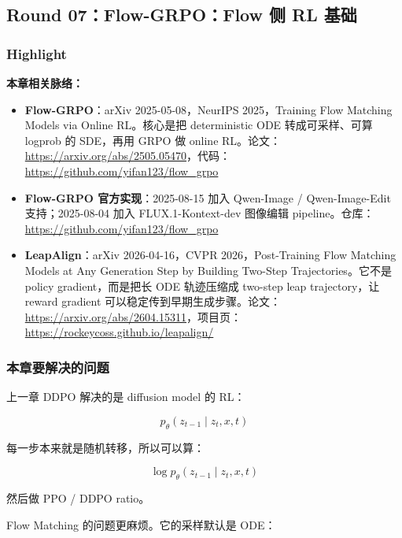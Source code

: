 
\subsection{Round 07：Flow-GRPO：Flow 侧 RL 基础}

\subsubsection{Highlight}

\begin{conceptbox}
\textbf{本章相关脉络：}
\begin{itemize}[leftmargin=1.5em]
  \item \textbf{Flow-GRPO}：arXiv 2025-05-08，NeurIPS 2025，Training Flow Matching Models via Online RL。核心是把 deterministic ODE 转成可采样、可算 logprob 的 SDE，再用 GRPO 做 online RL。论文：\url{https://arxiv.org/abs/2505.05470}，代码：\url{https://github.com/yifan123/flow_grpo}
  \item \textbf{Flow-GRPO 官方实现}：2025-08-15 加入 Qwen-Image / Qwen-Image-Edit 支持；2025-08-04 加入 FLUX.1-Kontext-dev 图像编辑 pipeline。仓库：\url{https://github.com/yifan123/flow_grpo}
  \item \textbf{LeapAlign}：arXiv 2026-04-16，CVPR 2026，Post-Training Flow Matching Models at Any Generation Step by Building Two-Step Trajectories。它不是 policy gradient，而是把长 ODE 轨迹压缩成 two-step leap trajectory，让 reward gradient 可以稳定传到早期生成步骤。论文：\url{https://arxiv.org/abs/2604.15311}，项目页：\url{https://rockeycoss.github.io/leapalign/}
\end{itemize}
\end{conceptbox}

\subsubsection{本章要解决的问题}

上一章 DDPO 解决的是 diffusion model 的 RL：

\[
p_\theta(z_{t-1}\mid z_t,x,t)
\]

每一步本来就是随机转移，所以可以算：

\[
\log p_\theta(z_{t-1}\mid z_t,x,t)
\]

然后做 PPO / DDPO ratio。

Flow Matching 的问题更麻烦。它的采样默认是 ODE：

